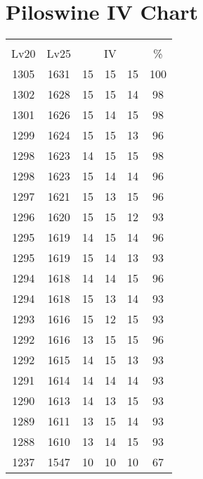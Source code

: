 \documentclass{article}%
\begin{document}
%
\normalsize%
\section{Piloswine IV Chart}%
\label{sec:Piloswine IV Chart}%
\renewcommand{\arraystretch}{1.5}%
\begin{tabular}{|c|c|c|c|c|c|}%
\hline%
\multicolumn{6}{|c|}{\textcolor{white}{ 
\linebreak{Piloswine}
}%
\cellcolor{black}}\\%
\multicolumn{1}{|c}{Lv20}&\multicolumn{1}{c|}{Lv25}&\multicolumn{3}{c|}{IV}&\multicolumn{1}{|c|}{\%}\\%
\hline%
\rowcolor{color100}%
1305&1631&15&15&15&100\\%
\hline%
\rowcolor{color98}%
1302&1628&15&15&14&98\\%
\hline%
\rowcolor{color98}%
1301&1626&15&14&15&98\\%
\hline%
\rowcolor{color96}%
1299&1624&15&15&13&96\\%
\hline%
\rowcolor{color98}%
1298&1623&14&15&15&98\\%
\hline%
\rowcolor{color96}%
1298&1623&15&14&14&96\\%
\hline%
\rowcolor{color96}%
1297&1621&15&13&15&96\\%
\hline%
\rowcolor{color93}%
1296&1620&15&15&12&93\\%
\hline%
\rowcolor{color96}%
1295&1619&14&15&14&96\\%
\hline%
\rowcolor{color93}%
1295&1619&15&14&13&93\\%
\hline%
\rowcolor{color96}%
1294&1618&14&14&15&96\\%
\hline%
\rowcolor{color93}%
1294&1618&15&13&14&93\\%
\hline%
\rowcolor{color93}%
1293&1616&15&12&15&93\\%
\hline%
\rowcolor{color96}%
1292&1616&13&15&15&96\\%
\hline%
\rowcolor{color93}%
1292&1615&14&15&13&93\\%
\hline%
\rowcolor{color93}%
1291&1614&14&14&14&93\\%
\hline%
\rowcolor{color93}%
1290&1613&14&13&15&93\\%
\hline%
\rowcolor{color93}%
1289&1611&13&15&14&93\\%
\hline%
\rowcolor{color93}%
1288&1610&13&14&15&93\\%
\hline%
\rowcolor{color91}%
1237&1547&10&10&10&67\\%
\end{tabular}

%
\end{document}
